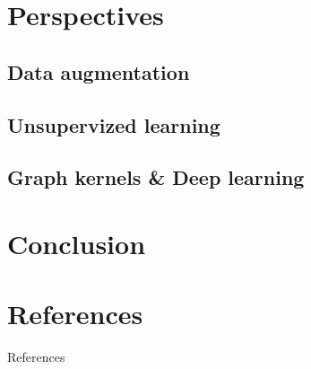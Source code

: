 \documentclass{beamer}
\begin{document}
    \section{Perspectives}
        \subsection{Data augmentation}
        \subsection{Unsupervized learning}
        \subsection{Graph kernels \& Deep learning}
    \section{Conclusion}

    \section*{References}
        \begin{frame}[allowframebreaks]{References}
            
            
        \end{frame}
\end{document}
